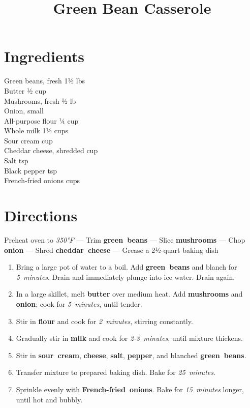 \documentclass[11pt,letterpaper]{article}
\title{Green Bean Casserole}
\author{}
\date{}
\begin{document}
\maketitle
\thispagestyle{empty}

\section*{Ingredients}
\setlength{\columnsep}{20pt}
\begin{multicols}{2}
\noindent
    Green beans, fresh \dotfill 1½ lbs \\
    Butter \dotfill ½ cup \\
    Mushrooms, fresh \dotfill ½ lb \\
    Onion, small  \\
    All-purpose flour \dotfill ¼ cup \\
    Whole milk \dotfill 1½ cups \\
    \columnbreak
    Sour cream  cup \\
    Cheddar cheese, shredded  cup \\
    Salt  tsp \\
    Black pepper  tsp \\
    French-fried onions  cups
\end{multicols}

\section*{Directions}

\noindent
Preheat oven to \textit{350°F} ---
Trim \textbf{green~beans} ---
Slice \textbf{mushrooms} ---
Chop \textbf{onion} ---
Shred \textbf{cheddar~cheese} ---
Grease a 2½-quart baking dish

\begin{enumerate}
    \item Bring a large pot of water to a boil. Add \textbf{green~beans} and blanch for \textit{5~minutes}. Drain and immediately plunge into ice water. Drain again.
    
    \item In a large skillet, melt \textbf{butter} over medium heat. Add \textbf{mushrooms} and \textbf{onion}; cook for \textit{5~minutes}, until tender.
    
    \item Stir in \textbf{flour} and cook for \textit{2~minutes}, stirring constantly.
    
    \item Gradually stir in \textbf{milk} and cook for \textit{2-3~minutes}, until mixture thickens.
    
    \item Stir in \textbf{sour~cream}, \textbf{cheese}, \textbf{salt}, \textbf{pepper}, and blanched \textbf{green~beans}.
    
    \item Transfer mixture to prepared baking dish. Bake for \textit{25~minutes}.
    
    \item Sprinkle evenly with \textbf{French-fried~onions}. Bake for \textit{15~minutes} longer, until hot and bubbly.
\end{enumerate}
\end{document}
